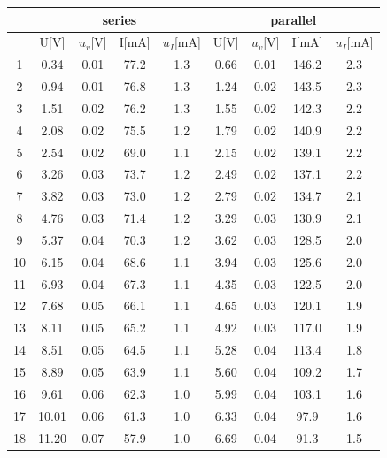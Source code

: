 \documentclass[12pt]{article}
\begin{document}
\begin{table}[H]
\centering
\begin{tabular}{|c|c|c|c|c|c|c|c|c|}
\hline
   & \multicolumn{4}{c|}{series}      & \multicolumn{4}{c|}{parallel}      \\ \hline
& U[V] &$u_v$[V] & I[mA]&$u_I$[mA]  & U[V]&$u_v$[V] & I[mA]&$u_I$[mA] \\ \hline
1  & 0.34&0.01     & 77.2&1.3            & 0.66&0.01     & 146.2&2.3         \\ \hline
2  & 0.94&0.01     & 76.8&1.3            & 1.24&0.02     & 143.5&2.3          \\ \hline
3  & 1.51&0.02     & 76.2&1.3            & 1.55&0.02     & 142.3&2.2          \\ \hline
4  & 2.08&0.02     & 75.5&1.2            & 1.79&0.02     & 140.9&2.2           \\ \hline
5  & 2.54&0.02     & 69.0&1.1            & 2.15&0.02     & 139.1&2.2         \\ \hline
6  & 3.26&0.03     & 73.7&1.2            & 2.49&0.02     & 137.1&2.2	           \\ \hline
7  & 3.82&0.03     & 73.0&1.2           & 2.79&0.02      & 134.7&2.1           \\ \hline
8  & 4.76&0.03     & 71.4&1.2            & 3.29&0.03     & 130.9&2.1           \\ \hline
9  & 5.37&0.04     & 70.3&1.2            & 3.62&0.03     & 128.5&2.0         \\ \hline
10 & 6.15&0.04     & 68.6&1.1            & 3.94&0.03     & 125.6&2.0          \\ \hline
11 & 6.93&0.04     & 67.3&1.1            & 4.35&0.03     & 122.5&2.0           \\ \hline
12 & 7.68&0.05     & 66.1&1.1            & 4.65&0.03     & 120.1&1.9         \\ \hline
13 & 8.11&0.05     & 65.2&1.1            & 4.92&0.03     & 117.0&1.9          \\ \hline
14 & 8.51&0.05     & 64.5&1.1            & 5.28&0.04     & 113.4&1.8           \\ \hline
15 & 8.89&0.05     & 63.9&1.1            & 5.60&0.04     & 109.2&1.7         \\ \hline
16 & 9.61&0.06     & 62.3&1.0            & 5.99&0.04     & 103.1&1.6          \\ \hline
17 & 10.01&0.06    & 61.3&1.0            & 6.33&0.04     & 97.9&1.6          \\ \hline
18 & 11.20&0.07    & 57.9&1.0            & 6.69&0.04     & 91.3&1.5           \\ \hline

\end{tabular}
\end{table}
\end{document}
